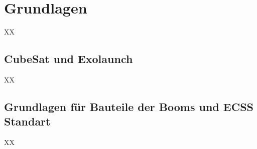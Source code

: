 \chapter{Grundlagen}
XX



\section{CubeSat und Exolaunch}

XX

\section{Grundlagen für Bauteile der Booms und ECSS Standart}
XX


